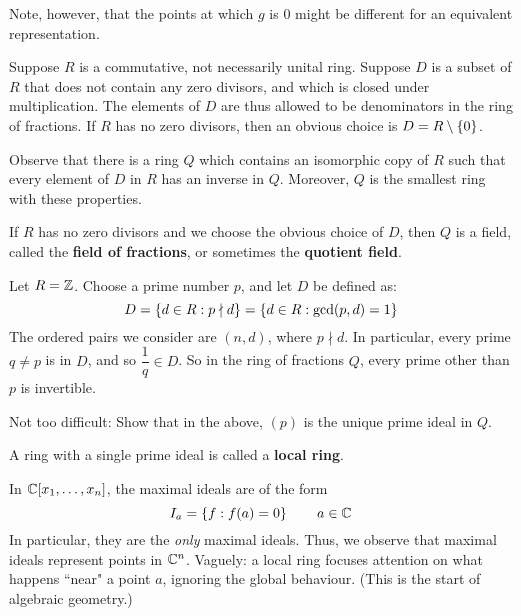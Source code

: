 Note, however, that the points at which $ g $ is 0 might be different for an equivalent
representation.


Suppose $ R $ is a commutative, not necessarily unital ring.
Suppose $ D $ is a subset of $ R $ that does not contain any zero divisors,
and which is closed under multiplication.
The elements of $ D $ are thus allowed to be denominators in the ring of fractions.
If $ R $ has no zero divisors, then an obvious choice is $ D = R \setminus \left\{{0}\right\} $.

Observe that there is a ring $ Q $ which contains an isomorphic copy of $ R $ such that
every element of $ D $ in $ R $ has an inverse in $ Q $.
Moreover, $ Q $ is the smallest ring with these properties.

If $ R $ has no zero divisors and we choose the obvious choice of $ D $, then
$ Q $ is a field, called the \textbf{field of fractions}, or sometimes the \textbf{quotient field}.

\begin{xmp}[source=Primary Source Material]
    Let $ R = \mathbb{Z} $. Choose a prime number $ p $, and let $ D $ be defined as:
    \begin{equation*}
        D = \left\{{d \in R : p \nmid d}\right\} = \left\{{d \in R : \gcd(p, d) = 1}\right\}
    \end{equation*}
    The ordered pairs we consider are $ (n, d) $, where $ p \nmid d $.
    In particular, every prime $ q \neq p $ is in $ D $, and so $ \dfrac{1}{q} \in D $.
    So in the ring of fractions $ Q $, every prime other than $ p $ is invertible.
\end{xmp}

\begin{exr}[source=Primary Source Material]
    Not too difficult: Show that in the above, $ (p) $ is the unique prime ideal in $ Q $.
\end{exr}

\begin{defn}
    A ring with a single prime ideal is called a \textbf{local ring}.
\end{defn}

In $ \mathbb{C}[x_{1}, \dots, x_{n}] $, the maximal ideals are of the form
\begin{equation*}
    I_{a} = \left\{{f : f(a) = 0}\right\} \qquad a \in \mathbb{C}
\end{equation*}
In particular, they are the \textit{only} maximal ideals.
Thus, we observe that maximal ideals represent points in $ \mathbb{C}^{n} $.
Vaguely: a local ring focuses attention on what happens ``near" a point $ a $, ignoring the
global behaviour. (This is the start of algebraic geometry.)

